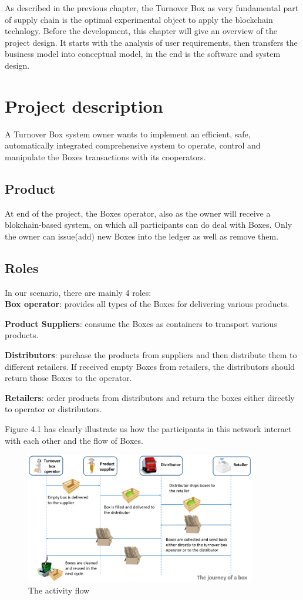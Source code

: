 As described in the previous chapter, the Turnover Box as very fundamental part of supply chain is the optimal experimental object to apply the blockchain technlogy. Before the development, this chapter will give an overview of the project design. It starts with the analysis of user requirements, then transfers the business model into conceptual model, in the end is the software and system design.


\section{Project description}
A Turnover Box system owner wants to implement an efficient, safe, automatically integrated comprehensive system to operate, control and manipulate the Boxes transactions with its cooperators.
\subsection{Product}
At end of the project, the Boxes operator, also as the owner will receive a blokchain-based system, on which all participants can do deal with Boxes. Only the owner can issue(add) new Boxes into the ledger as well as remove them.
\subsection{Roles}
In our scenario, there are mainly 4 roles:\\
\textbf{Box operator}: provides all types of the Boxes for delivering various products.

\textbf{Product Suppliers}: consume the Boxes as containers to transport various products.

\textbf{Distributors}: purchase the products from suppliers and then distribute them to different retailers. If received empty Boxes from retailers, the distributors should return those Boxes to the operator.

\textbf{Retailers}: order products from distributors and return the boxes either directly to operator or distributors. 

\bigskip
Figure 4.1 has clearly illustrate us how the participants in this network interact with each other and the flow of Boxes.
\begin{figure}[H]%
	\includegraphics[width=0.9\textwidth]{charts/boxflow}
	\caption{The activity flow}
	\label{fig:label}
\end{figure}

